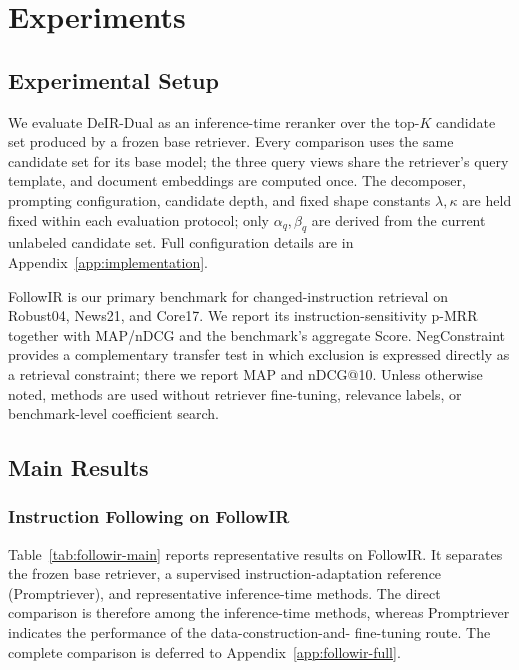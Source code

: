 \documentclass[letterpaper]{article}
\newcommand{\method}{DeIR-Dual}
\begin{document}
\section{Experiments}
\label{sec:experiments}

\subsection{Experimental Setup}
\label{sec:evaluation-overview}

We evaluate \method{} as an inference-time reranker over the top-$K$
candidate set produced by a frozen base retriever.  Every comparison uses
the same candidate set for its base model; the three query views share the
retriever's query template, and document embeddings are computed once.
The decomposer, prompting configuration, candidate depth, and fixed shape
constants $\lambda,\kappa$ are held fixed within each evaluation protocol;
only $\alpha_q,\beta_q$ are derived from the current unlabeled candidate
set.  Full configuration details are in Appendix~\ref{app:implementation}.

FollowIR \cite{weller-etal-2025-followir} is our primary benchmark for
changed-instruction retrieval on Robust04, News21, and Core17.  We report
its instruction-sensitivity p-MRR together with MAP/nDCG and the
benchmark's aggregate Score.  NegConstraint \cite{xu2025logical} provides
a complementary transfer test in which exclusion is expressed directly as
a retrieval constraint; there we report MAP and nDCG@10.  Unless otherwise
noted, methods are used without retriever fine-tuning, relevance labels,
or benchmark-level coefficient search.

\subsection{Main Results}
\label{sec:main-results}

\subsubsection{Instruction Following on FollowIR}

Table~\ref{tab:followir-main} reports representative results on FollowIR.
It separates the frozen base retriever, a supervised instruction-adaptation
reference (Promptriever), and representative inference-time methods.  The
direct comparison is therefore among the inference-time methods, whereas
Promptriever indicates the performance of the data-construction-and-
fine-tuning route.  The complete comparison is deferred to
Appendix~\ref{app:followir-full}.
\end{document}
